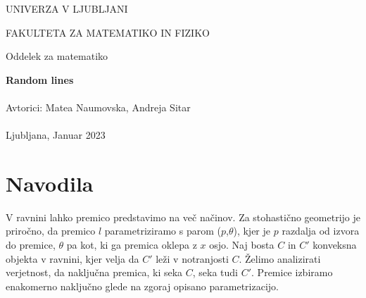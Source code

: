 \documentclass[a4paper,12pt]{article}
\begin{document}
\thispagestyle{empty}
\begin{center}
	
\begin{center}
	\normalsize
	UNIVERZA V LJUBLJANI
	
	FAKULTETA ZA MATEMATIKO IN FIZIKO
	
	Oddelek za matematiko
\end{center}
\vspace{6cm}
	\vspace{1.5cm}
	{\Large \bfseries Random lines
		\vspace{0.1cm}} \\  
        \vspace{0.3cm}{\normalsize FINANČNI PRAKTIKUM}\\
	\vspace{0.5cm} {\normalsize Avtorici: Matea Naumovska, Andreja Sitar}
	\vspace{0.2cm} \\
        \vspace{0.2cm}{\normalsize
        Mentorja: prof. dr. Sergia Cabello Justo, doc. dr. Janoš Vidali}\\
	\vspace{8cm}
	{\normalsize Ljubljana, Januar 2023}
\end{center}
\tableofcontents
\newpage
\section{Navodila}	
V ravnini lahko premico predstavimo na več načinov. Za stohastično geometrijo je priročno, da premico $l$ parametriziramo s parom ($p$,$\theta$), kjer je $p$ razdalja od izvora do premice, $\theta$ pa kot, ki ga premica oklepa z $x$ osjo. 
Naj bosta $C$ in $C'$ konveksna objekta v ravnini, kjer velja da $C'$ leži v notranjosti $C$. Želimo analizirati verjetnost, da naključna premica, ki seka $C$, seka tudi $C'$.
Premice izbiramo enakomerno naključno glede na zgoraj opisano parametrizacijo. 
\end{document}
